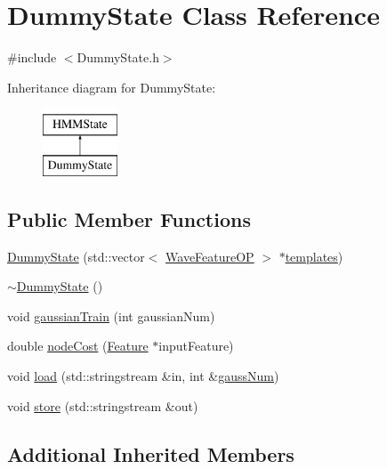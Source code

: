 \hypertarget{class_dummy_state}{\section{Dummy\+State Class Reference}
\label{class_dummy_state}
}


{\ttfamily \#include $<$Dummy\+State.\+h$>$}

Inheritance diagram for Dummy\+State\+:\begin{figure}[H]
\begin{center}
\leavevmode
\includegraphics[height=2.000000cm]{class_dummy_state}
\end{center}
\end{figure}
\subsection*{Public Member Functions}
\begin{DoxyCompactItemize}
\item 
\hyperlink{class_dummy_state_a968f19f362de62f9cabad8a110909d00}{Dummy\+State} (std\+::vector$<$ \hyperlink{class_wave_feature_o_p}{Wave\+Feature\+O\+P} $>$ $\ast$\hyperlink{class_h_m_m_state_a04d0b1a1570a339e5cd0db13aeb0d2ae}{templates})
\item 
\hyperlink{class_dummy_state_a21d9845c645182e4899d92ac63e042b0}{$\sim$\+Dummy\+State} ()
\item 
void \hyperlink{class_dummy_state_a3ea8e5a558e56079610eb1b0faee2ef9}{gaussian\+Train} (int gaussian\+Num)
\item 
double \hyperlink{class_dummy_state_a696495e250c01d42c48c6a5f79b1f1d8}{node\+Cost} (\hyperlink{class_feature}{Feature} $\ast$input\+Feature)
\item 
void \hyperlink{class_dummy_state_a7aecab0455227d309908efd3c0cdbaa3}{load} (std\+::stringstream \&in, int \&\hyperlink{pro6__demo_8cpp_a923ffcfa3c56ccdba17bc4e700247d54}{gauss\+Num})
\item 
void \hyperlink{class_dummy_state_a3759cade768196f1f920aa683336ed55}{store} (std\+::stringstream \&out)
\end{DoxyCompactItemize}
\subsection*{Additional Inherited Members}


